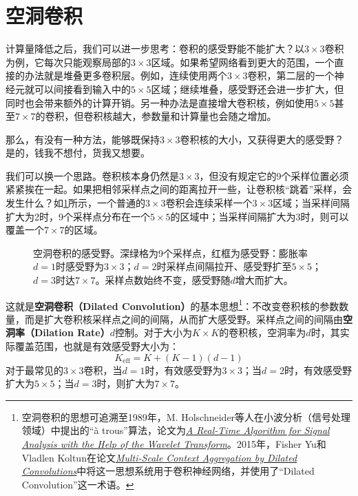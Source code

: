 \section{空洞卷积}

计算量降低之后，我们可以进一步思考：卷积的感受野能不能扩大？以$3\times3$卷积为例，它每次只能观察局部的$3\times3$区域。如果希望网络看到更大的范围，一个直接的办法就是堆叠更多卷积层。例如，连续使用两个$3\times3$卷积，第二层的一个神经元就可以间接看到输入中的$5\times5$区域；继续堆叠，感受野还会进一步扩大，但同时也会带来额外的计算开销。另一种办法是直接增大卷积核，例如使用$5\times5$甚至$7\times7$的卷积，但卷积核越大，参数量和计算量也会随之增加。

那么，有没有一种方法，能够既保持$3\times3$卷积核的大小，又获得更大的感受野？是的，钱我不想付，货我又想要。

我们可以换一个思路。卷积核本身仍然是$3\times3$，但没有规定它的9个采样位置必须紧紧挨在一起。如果把相邻采样点之间的距离拉开一些，让卷积核“跳着”采样，会发生什么？如\cref{fig:receptive_field}所示，一个普通的$3\times3$卷积会连续采样一个$3\times3$区域；当采样间隔扩大为2时，9个采样点分布在一个$5\times5$的区域中；当采样间隔扩大为3时，则可以覆盖一个$7\times7$的区域。

\begin{figure}[H]
    \caption{空洞卷积的感受野。深绿格为9个采样点，红框为感受野：膨胀率$d=1$时感受野为$3\times 3$；$d=2$时采样点间隔拉开、感受野扩至$5\times 5$；$d=3$时达$7\times 7$。采样点数始终不变，感受野随$d$增大而扩大。}
    \label{fig:receptive_field}
\end{figure}

这就是\textbf{空洞卷积（Dilated Convolution）}的基本思想\footnote{空洞卷积的思想可追溯至1989年，M. Holschneider等人在小波分析（信号处理领域）中提出的“à trous”算法，论文为\href{https://doi.org/10.1007/978-3-642-75988-8_28}{\textit{A Real-Time Algorithm for Signal Analysis with the Help of the Wavelet Transform}}。2015年，Fisher Yu和Vladlen Koltun在论文\href{https://arxiv.org/abs/1511.07122}{\textit{Multi-Scale Context Aggregation by Dilated Convolutions}}中将这一思想系统用于卷积神经网络，并使用了“Dilated Convolution”这一术语。}：不改变卷积核的参数数量，而是扩大卷积核采样点之间的间隔，从而扩大感受野。采样点之间的间隔由\textbf{空洞率（Dilation Rate）}$d$控制。对于大小为$K\times K$的卷积核，空洞率为$d$时，其实际覆盖范围，也就是有效感受野大小为：
$$
K_{\mathrm{eff}}=K+(K-1)(d-1)
$$
对于最常见的$3\times3$卷积，当$d=1$时，有效感受野为$3\times3$；当$d=2$时，有效感受野扩大为$5\times5$；当$d=3$时，则扩大为$7\times7$。

